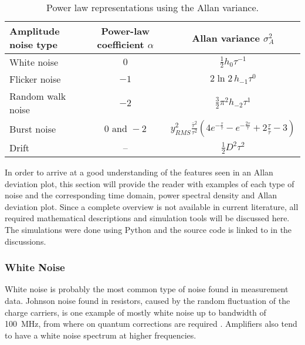 \begin{table}[ht]
    \centering
    \begin{tabular}{lcc}
        \toprule
        Amplitude noise type& Power-law coefficient $\alpha$& Allan variance $\sigma_A^2$\\
        \midrule
            White noise & $0$& $\frac 1 2 h_0 \tau^{-1}$ \cite{adev_noise_types}\\
            Flicker noise& $-1$& $2 \ln 2 \, h_{-1} \tau^0$ \cite{adev_noise_types}\\
            Random walk noise& $-2$& $\frac 3 2 \pi^2 h_{-2} \tau^{1}$ \cite{adev_noise_types}\\
            Burst noise& $0 \textrm{ and } -\!2$& $y_{RMS}^2\frac{\bar \tau^2}{\tau^2} \left(4 e^{-\frac{\tau}{\bar \tau}} - e^{-\frac{2 \tau}{\bar \tau}} + 2 \frac{\tau}{\bar \tau} - 3 \right)$\\
            Drift & --& $\frac 1 2 D^2 \tau^2$ \cite{adev_drift}\\
        \bottomrule
    \end{tabular}
    \caption{Power law representations using the Allan variance.}
    \label{tab:adev_alpha}
\end{table}

In order to arrive at a good understanding of the features seen in an Allan deviation plot, this section will provide the reader with examples of each type of noise and the corresponding time domain, power spectral density and Allan deviation plot. Since a complete overview is not available in current literature, all required mathematical descriptions and simulation tools will be discussed here. The simulations were done using Python and the source code is linked to in the discussions.

\clearpage
\subsubsection{White Noise}
White noise is probably the most common type of noise found in measurement data. Johnson noise found in resistors, caused by the random fluctuation of the charge carriers, is one example of mostly white noise up to bandwidth of \qty{100}{\MHz}, from where on quantum corrections are required \cite{nist_johnson_noise}. Amplifiers also tend to have a white noise spectrum at higher frequencies.

